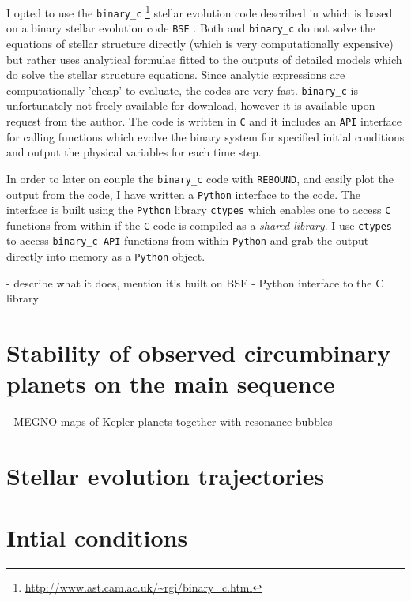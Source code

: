 I opted to use the \texttt{binary_c}
\footnote{\url{http://www.ast.cam.ac.uk/~rgi/binary_c.html}}
stellar evolution code described in
\cite{izzard2004,izzard2006,izzard2008} which is based on a binary
stellar evolution code \texttt{BSE} \citep{hurley2002}. Both 
and \texttt{binary_c} do not solve the equations of stellar structure directly
(which is very computationally expensive) but rather uses analytical formulae
fitted to the outputs of detailed models which do solve the stellar structure
equations. Since analytic expressions are computationally 'cheap' to evaluate,
the codes are very fast. \texttt{binary_c}
is unfortunately not freely available for download, however it is available
upon request from the author. The code is written in \texttt{C} and it
includes an \texttt{API} interface for calling functions which 
evolve the binary system for specified initial conditions and output the
physical variables for each time step.

In order to later on couple the \texttt{binary_c} code with \texttt{REBOUND},
and easily plot the output from the code, I have written a \texttt{Python}
interface to the code. The interface is built using the \texttt{Python} 
library \texttt{ctypes} which enables one to access \texttt{C} functions
from within \texttt{\Python} if the \texttt{C} code is compiled as a \emph{
    shared library}. I use \texttt{ctypes} to access \texttt{binary_c API}
functions from within \texttt{Python} and grab the output directly into memory
as a \texttt{Python} object.


- describe what it does, mention it's built on BSE
- Python interface to the C library

\section{Stability of observed circumbinary planets on the main sequence}
\label{sec:Stability of observed circumbinary planets on the main sequence}
- MEGNO maps of Kepler planets together with resonance bubbles

\section{Stellar evolution trajectories}
\label{sec:Stellar evolution trajectories}


\section{Intial conditions}
\label{sec:Intial conditions}
